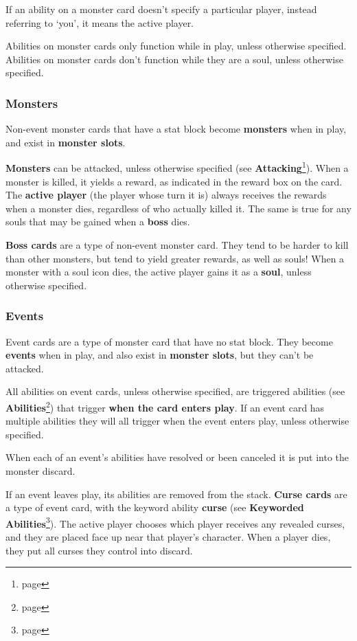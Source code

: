 \documentclass[10pt, a4paper, twoside]{article} %
\begin{document}
    If an ability on a monster card doesn’t specify a particular player, instead referring to ‘you’, it means the active player.

    Abilities on monster cards only function while in play, unless otherwise specified. Abilities on monster cards don’t function while they are a soul, unless otherwise specified.

    \subsubsection{Monsters}
    Non-event monster cards that have a stat block become \textbf{monsters} when in play, and exist in \textbf{monster slots}.

    \textbf{Monsters} can be attacked, unless otherwise specified (see \textbf{Attacking}\footnote{page \pageref{attacking}}).
    When a monster is killed, it yields a reward, as indicated in the reward box on the card. The \textbf{active player} (the player whose turn it is) always receives the rewards when a monster dies, regardless of who actually killed it. The same is true for any souls that may be gained when a \textbf{boss} dies.

    \textbf{Boss cards} are a type of non-event monster card. They tend to be harder to kill than other monsters, but tend to yield greater rewards, as well as souls! When a monster with a soul icon dies, the active player gains it as a \textbf{soul}, unless otherwise specified.

    \subsubsection{Events}
    Event cards are a type of monster card that have no stat block. They become \textbf{events} when in play, and also exist in \textbf{monster slots}, but they can’t be attacked.

    All abilities on event cards, unless otherwise specified, are triggered abilities (see \textbf{Abilities}\footnote{page \pageref{abilities}}) that trigger \textbf{when the card enters play}. If an event card has multiple abilities they will all trigger when the event enters play, unless otherwise specified.

    When each of an event’s abilities have resolved or been canceled it is put into the monster discard.

    If an event leaves play, its abilities are removed from the stack.
    \textbf{Curse cards} are a type of event card, with the keyword ability \textbf{curse} (see \textbf{Keyworded Abilities}\footnote{page \pageref{keyworded}}). The active player chooses which player receives any revealed curses, and they are placed face up near that player’s character. When a player dies, they put all curses they control into discard.
\end{document}
